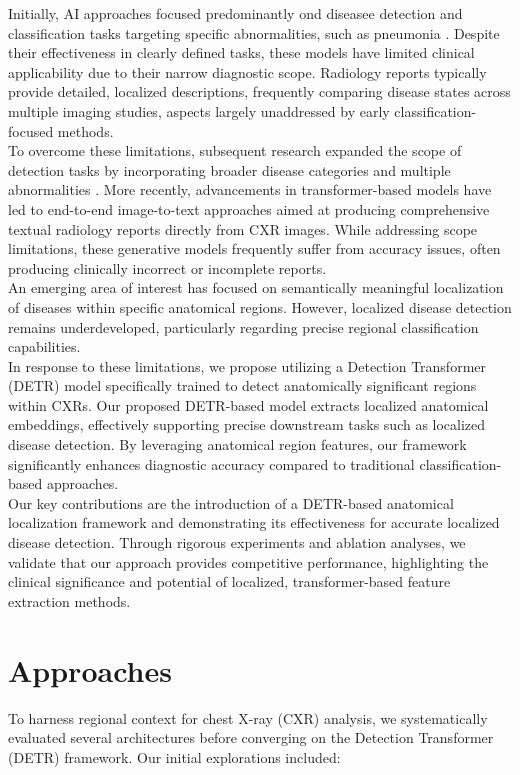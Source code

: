 \documentclass[10pt,twocolumn,letterpaper]{article}
\begin{document}
Initially, AI approaches focused predominantly ond diseasee detection and classification tasks targeting specific abnormalities, such as pneumonia \cite{rajpurkar2017chexnet}. Despite their effectiveness in clearly defined tasks, these models have limited clinical applicability due to their narrow diagnostic scope. Radiology reports typically provide detailed, localized descriptions, frequently comparing disease states across multiple imaging studies, aspects largely unaddressed by early classification-focused methods.\\

To overcome these limitations, subsequent research expanded the scope of detection tasks by incorporating broader disease categories and multiple abnormalities \cite{wu2020comparison}. More recently, advancements in transformer-based models have led to end-to-end image-to-text approaches aimed at producing comprehensive textual radiology reports directly from CXR images. While addressing scope limitations, these generative models frequently suffer from accuracy issues, often producing clinically incorrect or incomplete reports.\\

An emerging area of interest has focused on semantically meaningful localization of diseases within specific anatomical regions. However, localized disease detection remains underdeveloped, particularly regarding precise regional classification capabilities.\\

In response to these limitations, we propose utilizing a Detection Transformer (DETR) model \cite{carion2020end} specifically trained to detect anatomically significant regions within CXRs. Our proposed DETR-based model extracts localized anatomical embeddings, effectively supporting precise downstream tasks such as localized disease detection. By leveraging anatomical region features, our framework significantly enhances diagnostic accuracy compared to traditional classification-based approaches.\\

Our key contributions are the introduction of a DETR-based anatomical localization framework and demonstrating its effectiveness for accurate localized disease detection. Through rigorous experiments and ablation analyses, we validate that our approach provides competitive performance, highlighting the clinical significance and potential of localized, transformer-based feature extraction methods.

\section{Approaches}
To harness regional context for chest X-ray (CXR) analysis, we systematically evaluated several architectures before converging on the Detection Transformer (DETR) framework. Our initial explorations included:
\end{document}
